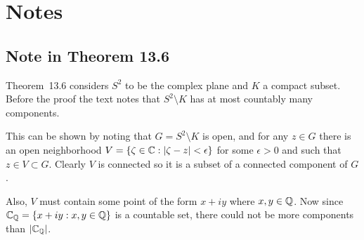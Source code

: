 
\section{Notes}

\subsection{Note in Theorem 13.6}

Theorem~13.6
considers \(S^2\) to be the complex plane and $K$ a compact subset.
Before the proof the text notes
that \(S^2 \setminus K\) has at most countably many components.

This can be shown by noting that \(G = S^2 \setminus K\)
is open, and for any \(z\in G\) there is an open neighborhood
\(V = \{\zeta\in \mathbb{C}: |\zeta - z|<\epsilon\}\)
for some \(\epsilon > 0\) and 
such that \(z \in V \subset G\). Clearly $V$ is connected
so it is a subset of a connected component of $G$.

Also, $V$ must contain
some point of the form \(x + iy\) where \(x,y\in\mathbb{Q}\).
Now since \(\mathbb{C}_{\mathbb{Q}} =\{x + iy: x,y\in\mathbb{Q}\}\) is a countable set,
there could not be more components than \(|\mathbb{C}_{\mathbb{Q}}|\).
